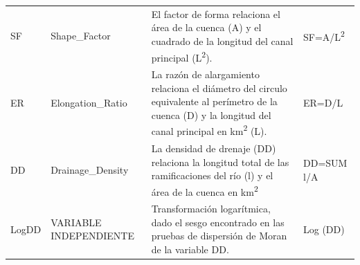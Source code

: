 \documentclass[11pt,]{article}
\begin{document}
\begin{longtable}[]{@{}llll@{}}
\begin{minipage}[t]{0.08\columnwidth}
SF\strut
\end{minipage} & \begin{minipage}[t]{0.25\columnwidth}\raggedright\strut
Shape\_Factor\strut
\end{minipage} & \begin{minipage}[t]{0.44\columnwidth}\raggedright\strut
El factor de forma relaciona el área de la cuenca (A) y el cuadrado de
la longitud del canal principal (L\textsuperscript{2}).\strut
\end{minipage} & \begin{minipage}[t]{0.12\columnwidth}\raggedright\strut
SF=A/L\textsuperscript{2}\strut
\end{minipage}\tabularnewline
\begin{minipage}[t]{0.08\columnwidth}\raggedright\strut
ER\strut
\end{minipage} & \begin{minipage}[t]{0.25\columnwidth}\raggedright\strut
Elongation\_Ratio\strut
\end{minipage} & \begin{minipage}[t]{0.44\columnwidth}\raggedright\strut
La razón de alargamiento relaciona el diámetro del circulo equivalente
al perímetro de la cuenca (D) y la longitud del canal principal en
km\textsuperscript{2} (L).\strut
\end{minipage} & \begin{minipage}[t]{0.12\columnwidth}\raggedright\strut
ER=D/L\strut
\end{minipage}\tabularnewline
\begin{minipage}[t]{0.08\columnwidth}\raggedright\strut
DD\strut
\end{minipage} & \begin{minipage}[t]{0.25\columnwidth}\raggedright\strut
Drainage\_Density\strut
\end{minipage} & \begin{minipage}[t]{0.44\columnwidth}\raggedright\strut
La densidad de drenaje (DD) relaciona la longitud total de las
ramificaciones del río (l) y el área de la cuenca en
km\textsuperscript{2}\strut
\end{minipage} & \begin{minipage}[t]{0.12\columnwidth}\raggedright\strut
DD=SUM l/A\strut
\end{minipage}\tabularnewline
\begin{minipage}[t]{0.08\columnwidth}\raggedright\strut
LogDD\strut
\end{minipage} & \begin{minipage}[t]{0.25\columnwidth}\raggedright\strut
VARIABLE INDEPENDIENTE\strut
\end{minipage} & \begin{minipage}[t]{0.44\columnwidth}\raggedright\strut
Transformación logarítmica, dado el sesgo encontrado en las pruebas de
dispersión de Moran de la variable DD.\strut
\end{minipage} & \begin{minipage}[t]{0.12\columnwidth}\raggedright\strut
Log (DD)\strut
\end{minipage}\tabularnewline
\bottomrule
\end{longtable}
\end{document}
